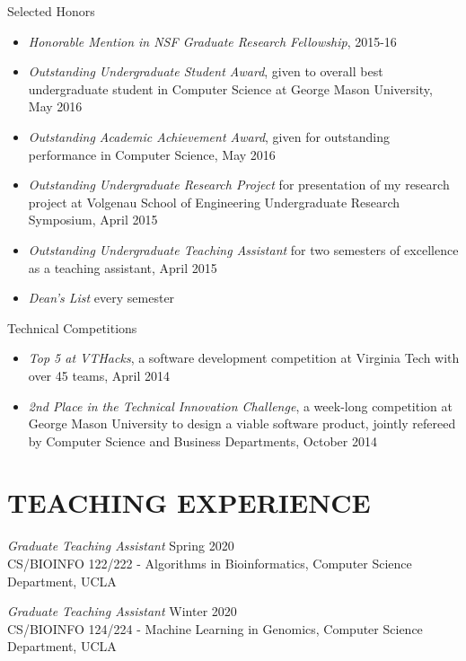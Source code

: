 \documentclass[margin, 10pt]{res} %
\begin{document}
\begin{resume}
Selected Honors
\begin{itemize} \itemsep -2pt %
\item {\sl Honorable Mention in NSF Graduate Research Fellowship}, 2015-16
\item {\sl Outstanding Undergraduate Student Award}, given to overall best undergraduate student in Computer Science at George Mason University, May 2016
\item {\sl Outstanding Academic Achievement Award}, given for outstanding performance in Computer Science, May 2016
\item {\sl Outstanding Undergraduate Research Project} for presentation of my research project at Volgenau School of Engineering Undergraduate Research Symposium, April 2015
\item {\sl Outstanding Undergraduate Teaching Assistant} for two semesters of excellence as a teaching assistant, April 2015
\item {\sl Dean's List} every semester
\end{itemize}


Technical Competitions
\begin{itemize} \itemsep -2pt %
\item {\sl Top 5 at VTHacks}, a software development competition at Virginia Tech with over 45 teams, April 2014
\item {\sl 2nd Place in the Technical Innovation Challenge}, a week-long competition at George Mason University to design a viable software product, jointly refereed by Computer Science and Business Departments, October 2014
\end{itemize}



 
\section{TEACHING EXPERIENCE}

{\sl Graduate Teaching Assistant} \hfill Spring 2020 \\
CS/BIOINFO 122/222 - Algorithms in Bioinformatics, Computer Science Department, UCLA

{\sl Graduate Teaching Assistant} \hfill Winter 2020 \\
CS/BIOINFO 124/224 - Machine Learning in Genomics, Computer Science Department, UCLA


\end{resume}
\end{document}
